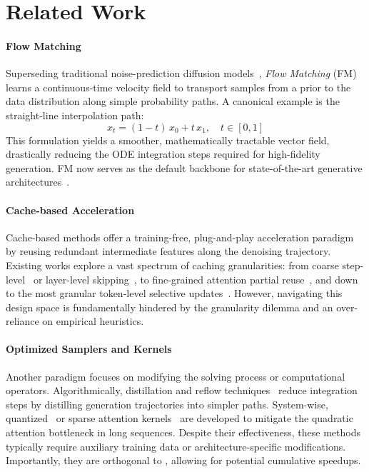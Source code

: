 \section{Related Work}
\paragraph{Flow Matching}
Superseding traditional noise-prediction diffusion models~\cite{ddpm, ddim}, \emph{Flow Matching} (FM)~\cite{flowmatching,rectifiedflow} learns a continuous-time velocity field to transport samples from a prior to the data distribution along simple probability paths.
A canonical example is the straight-line interpolation path:
$$
x_t = (1 - t)\, x_0 + t\, x_1, \quad t \in [0, 1]
$$
This formulation yields a smoother, mathematically tractable vector field, drastically reducing the ODE integration steps required for high-fidelity generation. FM now serves as the default backbone for state-of-the-art generative architectures~\cite{opensora2,flux,wan,hunyuan,sd3,firered}.


\paragraph{Cache-based Acceleration}
Cache-based methods offer a training-free, plug-and-play acceleration paradigm by reusing redundant intermediate features along the denoising trajectory. Existing works explore a vast spectrum of caching granularities: from coarse step-level~\cite{teacache,magcache,meancache,taylorseer} or layer-level skipping~\cite{blockdance,adnan2025foresightadaptivelayerreuse}, to fine-grained attention partial reuse~\cite{pab,deltadit,ditfastattn}, and down to the most granular token-level selective updates~\cite{tokencache,ras,jano}. However, navigating this design space is fundamentally hindered by the granularity dilemma and an over-reliance on empirical heuristics.

\paragraph{Optimized Samplers and Kernels}
Another paradigm focuses on modifying the solving process or computational operators. Algorithmically, distillation and reflow techniques~\cite{distill1,rectifiedflow} reduce integration steps by distilling generation trajectories into simpler paths. System-wise, quantized~\cite{sageattention1} or sparse attention kernels~\cite{sparsevideogen} are developed to mitigate the quadratic attention bottleneck in long sequences. Despite their effectiveness, these methods typically require auxiliary training data or architecture-specific modifications. Importantly, they are orthogonal to \cubic, allowing for potential cumulative speedups.
